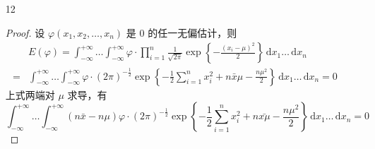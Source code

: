 \documentclass[normal,founder,mtpro2,cn]{elegantnote}
\begin{document}
\begin{enumerate}
\begin{proof}
\begin{equation*}
                I\left(\lambda\right)=-E\left[\frac{\partial^{2}}{\partial\lambda^{2}}\ln p\left(x;\lambda\right)\right]=\frac{\alpha}{\lambda^{2}}
            \end{equation*}
            故，$g\left(\lambda\right)=\frac{1}{\lambda}$ 的任一无偏估计的 C-R 下界为
            \begin{equation*}
                \frac{\left[g^{\prime}\left(\lambda\right)\right]^{2}}{nI\left(\lambda\right)}=\frac{1}{n\alpha\lambda^{2}}
            \end{equation*}
            同时，
            \begin{equation*}
                \frac{\bar{x}}{\alpha}=\frac{1}{n\alpha}\sum_{i=1}^{n}x_{i}\sim\operatorname{Ga}\left(n\alpha,n\alpha\lambda\right)
            \end{equation*}
            因此，
            \begin{equation*}
                E\left(\frac{\bar{x}}{\alpha}\right)=\frac{n\alpha}{n\alpha\lambda}=\frac{1}{\lambda}=g\left(\lambda\right),\quad\operatorname{Var}\left(\frac{\bar{x}}{\alpha}\right)=\frac{n\alpha}{\left(n\alpha\lambda\right)^{2}}=\frac{1}{n\alpha\lambda^{2}}
            \end{equation*}
            故，$\frac{\bar{x}}{\alpha}$ 是 $g(\lambda)=\frac{1}{\lambda}$ 的有效估计，从而也是 UMVUE。
        \end{proof}
    \item[12]
        \begin{proof}
            设 $\varphi\left(x_{1},x_{2},\ldots,x_{n}\right)$ 是 $0$ 的任一无偏估计，则
            \begin{equation*}
                \begin{aligned}
                      & E\left(\varphi\right)=\int_{-\infty}^{+\infty}\ldots\int_{-\infty}^{+\infty}\varphi\cdot\prod_{i=1}^{n}\frac{1}{\sqrt{2\pi}}\exp\left\{-\frac{\left(x_{i}-\mu\right)^{2}}{2}\right\}\,\mathrm{d}x_{1}\ldots\,\mathrm{d}x_{n} \\
                    = & \int_{-\infty}^{+\infty}\ldots\int_{-\infty}^{+\infty}\varphi\cdot(2\pi)^{-\frac{1}{2}}\exp\left\{-\frac{1}{2}\sum_{i=1}^{n}x_{i}^{2}+n\bar{x}\mu-\frac{n\mu^{2}}{2}\right\}\,\mathrm{d}x_{1}\ldots\,\mathrm{d}x_{n}=0
                \end{aligned}
            \end{equation*}
            上式两端对 $\mu$ 求导，有
            \begin{equation*}
                \int_{-\infty}^{+\infty}\ldots\int_{-\infty}^{+\infty}\left(n\bar{x}-n\mu\right)\varphi\cdot(2\pi)^{-\frac{1}{2}}\exp\left\{-\frac{1}{2}\sum_{i=1}^{n}x_{i}^{2}+n\bar{x\mu}-\frac{n\mu^{2}}{2}\right\}\,\mathrm{d}x_{1}\ldots\,\mathrm{d}x_{n}=0

\end{equation*}
\end{proof}
\end{enumerate}
\end{document}
